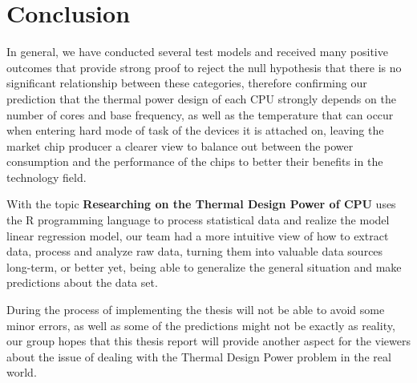 %
%
%   
\clearpage
\section{Conclusion}
In general, we have conducted several test models and received many positive outcomes that provide strong proof to reject the null hypothesis that there is no significant relationship between these categories, therefore confirming our prediction that the thermal power design of each CPU strongly depends on the number of cores and base frequency, as well as the temperature that can occur when entering hard mode of task of the devices it is attached on, leaving the market chip producer a clearer view to balance out between the power consumption and the performance of the chips to better their benefits in the technology field.

With the topic \textbf{Researching on the Thermal Design Power of CPU} uses the R programming language to process statistical data and realize the model linear regression model, our team had a more intuitive view of how to extract data, process and analyze raw data, turning them into valuable data sources long-term, or better yet, being able to generalize the general situation and make predictions about the data set.

During the process of implementing the thesis will not be able to avoid some minor errors, as well as some of the predictions might not be exactly as reality, our group hopes that this thesis report will provide another aspect for the viewers about the issue of dealing with the Thermal Design Power problem in the real world.